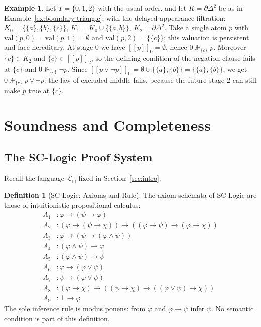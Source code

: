 \documentclass[final,12pt]{elsarticle}
\newcommand{\llbracket}{[\![}
\newcommand{\rrbracket}{]\!]}
\theoremstyle{plain}
\theoremstyle{definition}
\newtheorem{defi}[thm]{Definition}
\newtheorem{exa}[thm]{Example}
\begin{document}
\begin{exa}
\label{ex:filtration-kripke}
Let \(T = \{0,1,2\}\) with the usual order, and let \(K = \partial\Delta^2\) be as in Example~\ref{ex:boundary-triangle}, with the delayed-appearance filtration:
\(K_0 = \{ \{a\}, \{b\}, \{c\} \}\), \(K_1 = K_0 \cup \{ \{a,b\} \}\), \(K_2 = \partial\Delta^2\).
Take a single atom \(p\) with \(\mathrm{val}(p,0) = \mathrm{val}(p,1) = \emptyset\) and \(\mathrm{val}(p,2) = \{\{c\}\}\); this valuation is persistent and face-hereditary.
At stage \(0\) we have \(\llbracket p \rrbracket_0 = \emptyset\), hence \(0 \nVdash_{\{c\}} p\). Moreover \(\{c\} \in K_2\) and \(\{c\} \in \llbracket p \rrbracket_2\), so the defining condition of the negation clause fails at \(\{c\}\) and \(0 \nVdash_{\{c\}} \neg p\). Since \(\llbracket p \lor \neg p \rrbracket_0 = \emptyset \cup \{\{a\},\{b\}\} = \{\{a\},\{b\}\}\), we get \(0 \nVdash_{\{c\}} p \lor \neg p\): the law of excluded middle fails, because the future stage \(2\) can still make \(p\) true at \(\{c\}\).
\end{exa}

\section{Soundness and Completeness}
\label{sec:sc}

\subsection{The SC-Logic Proof System}
\label{subsec:proof-system}

Recall the language $\mathcal{L}_\Box$ fixed in Section~\ref{sec:intro}.

\begin{defi}[SC-Logic: Axioms and Rule]
\label{def:sc-logic-axioms}
The axiom schemata of SC-Logic are those of intuitionistic propositional calculus:
\begin{align*}
A_1 &: \varphi \to (\psi \to \varphi) \\
A_2 &: (\varphi \to (\psi \to \chi)) \to ((\varphi \to \psi) \to (\varphi \to \chi)) \\
A_3 &: \varphi \to (\psi \to (\varphi \land \psi)) \\
A_4 &: (\varphi \land \psi) \to \varphi \\
A_5 &: (\varphi \land \psi) \to \psi \\
A_6 &: \varphi \to (\varphi \lor \psi) \\
A_7 &: \psi \to (\varphi \lor \psi) \\
A_8 &: (\varphi \to \chi) \to ((\psi \to \chi) \to ((\varphi \lor \psi) \to \chi)) \\
A_9 &: \bot \to \varphi
\end{align*}
The sole inference rule is modus ponens: from \(\varphi\) and \(\varphi \to \psi\)
infer \(\psi\). No semantic condition is part of this definition.
\end{defi}
\end{document}
